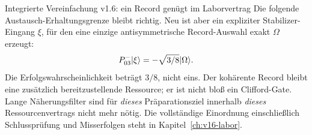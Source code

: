 \begin{bild}{Integrierte Vereinfachung v1.6: ein Record genügt im Laborvertrag}
Die folgende Austausch-Erhaltungsgrenze bleibt richtig. Neu ist aber ein expliziter Stabilizer-Eingang $\xi$, für den eine einzige antisymmetrische Record-Auswahl exakt $\Omega$ erzeugt:
\[
P^-_{03}\lvert\xi\rangle=-\sqrt{3/8}\lvert\Omega\rangle.
\]
Die Erfolgswahrscheinlichkeit beträgt $3/8$, nicht eins. Der kohärente Record bleibt eine zusätzlich bereitzustellende Ressource; er ist nicht bloß ein Clifford-Gate. Lange Näherungsfilter sind für \emph{dieses} Präparationsziel innerhalb \emph{dieses} Ressourcenvertrags nicht mehr nötig. Die vollständige Einordnung einschließlich Schlussprüfung und Misserfolgen steht in Kapitel~\ref{ch:v16-labor}.
\end{bild}
